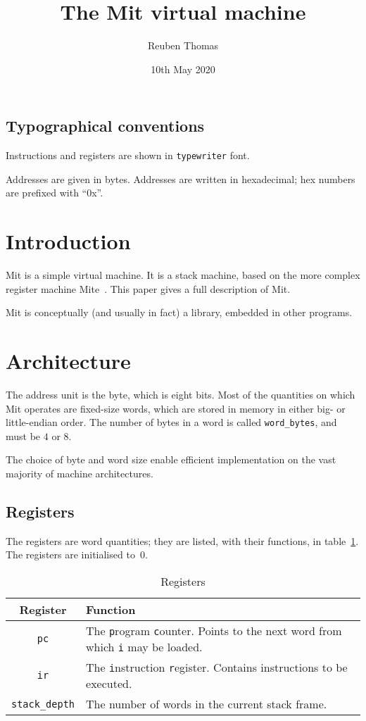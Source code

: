 \documentclass[a4paper]{article}
\title{The Mit virtual machine}
\author{Reuben Thomas}
\date{10th May 2020}
\begin{document}
\maketitle

\subsection*{Typographical conventions}

Instructions and registers are shown in {\tt typewriter} font.

Addresses are given in bytes. Addresses are written in hexadecimal; hex numbers are prefixed with “0x”.


\section{Introduction}

Mit is a simple virtual machine. It is a stack machine, based on the more complex register machine Mite~\cite{mite0}.
This paper gives a full description of Mit.

Mit is conceptually (and usually in fact) a library, embedded in other programs.


\section{Architecture}

The address unit is the byte, which is eight bits.
Most of the quantities on which Mit operates are fixed-size words, which are stored in memory in either big- or little-endian order. The number of bytes in a word is called {\tt word\_bytes}, and must be $4$ or $8$.

The choice of byte and word size enable efficient implementation on the vast majority of machine architectures.


\subsection{Registers}
\label{registers}

The registers are word quantities; they are listed, with their functions, in table~\ref{regtable}. The registers are initialised to~$0$.

\begin{table}[htbp]
\begin{center}
\begin{tabular}{cp{3.75in}} \toprule
\bf Register & \bf Function \\
 \midrule
{\tt pc} & The {\tt p}rogram {\tt c}ounter. Points to the next word from which {\tt i} may be loaded. \\
{\tt ir} & The {\tt i}nstruction {\tt r}egister. Contains instructions to be executed. \\
{\tt stack\_depth} & The number of words in the current stack frame. \\
 \bottomrule
\end{tabular}
\caption{\label{regtable}Registers}
\end{center}
\end{table}
\end{document}
